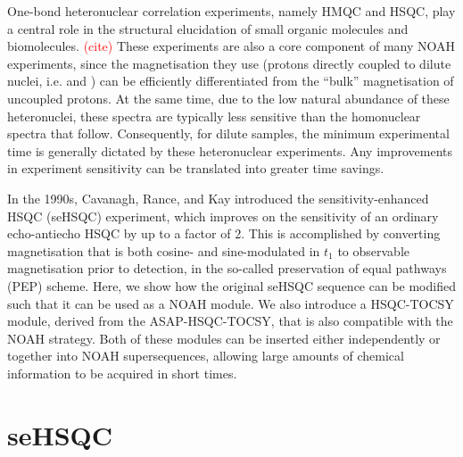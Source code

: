 \documentclass[11pt]{article}
\newcommand*{\carbon}{\ce{^{13}C}}
\newcommand*{\nitrogen}{\ce{^{15}N}}
\newcommand*{\red}[1]{\textcolor{red}{#1}}
\begin{document}
One-bond heteronuclear correlation experiments, namely HMQC and HSQC, play a central role in the structural elucidation of small organic molecules and biomolecules.
\red{(cite)}
These experiments are also a core component of many NOAH experiments, since the magnetisation they use (protons directly coupled to dilute nuclei, i.e. \carbon{} and \nitrogen{}) can be efficiently differentiated from the ``bulk'' magnetisation of uncoupled protons.\autocite{Garbow1982CPL, Kupce2019JMR}
At the same time, due to the low natural abundance of these heteronuclei, these spectra are typically less sensitive than the homonuclear spectra that follow.
Consequently, for dilute samples, the minimum experimental time is generally dictated by these heteronuclear experiments.
Any improvements in experiment sensitivity can be translated into greater time savings.

In the 1990s, Cavanagh, Rance, and Kay introduced the sensitivity-enhanced HSQC (seHSQC) experiment, which improves on the sensitivity of an ordinary echo-antiecho HSQC by up to a factor of 2.\autocite{sehsqc}
This is accomplished by converting magnetisation that is both cosine- and sine-modulated in $t_1$ to observable magnetisation prior to detection, in the so-called preservation of equal pathways (PEP) scheme.
Here, we show how the original seHSQC sequence can be modified such that it can be used as a NOAH module.
We also introduce a HSQC-TOCSY module, derived from the ASAP-HSQC-TOCSY,\autocite{Becker2019JMR} that is also compatible with the NOAH strategy.
Both of these modules can be inserted either independently or together into NOAH supersequences, allowing large amounts of chemical information to be acquired in short times.

\section*{\texorpdfstring{\carbon{}}{13C} seHSQC}
\end{document}

